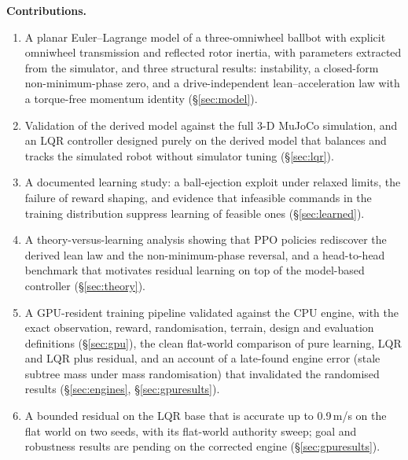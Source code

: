 \documentclass[conference]{IEEEtran}
\theoremstyle{remark}
\begin{document}
\textbf{Contributions.}
\begin{enumerate}
\item A planar Euler--Lagrange model of a three-omniwheel ballbot with explicit omniwheel transmission and reflected rotor inertia, with parameters extracted from the simulator, and three structural results: instability, a closed-form non-minimum-phase zero, and a drive-independent lean--acceleration law with a torque-free momentum identity (\S\ref{sec:model}).
\item Validation of the derived model against the full 3-D MuJoCo simulation, and an LQR controller designed purely on the derived model that balances and tracks the simulated robot without simulator tuning (\S\ref{sec:lqr}).
\item A documented learning study: a ball-ejection exploit under relaxed limits, the failure of reward shaping, and evidence that infeasible commands in the training distribution suppress learning of feasible ones (\S\ref{sec:learned}).
\item A theory-versus-learning analysis showing that PPO policies rediscover the derived lean law and the non-minimum-phase reversal, and a head-to-head benchmark that motivates residual learning on top of the model-based controller (\S\ref{sec:theory}).
\item A GPU-resident training pipeline validated against the CPU engine, with the exact observation, reward, randomisation, terrain, design and evaluation definitions (\S\ref{sec:gpu}), the clean flat-world comparison of pure learning, LQR and LQR plus residual, and an account of a late-found engine error (stale subtree mass under mass randomisation) that invalidated the randomised results (\S\ref{sec:engines}, \S\ref{sec:gpuresults}).
\item A bounded residual on the LQR base that is accurate up to 0.9\,m/s on the flat world on two seeds, with its flat-world authority sweep; goal and robustness results are pending on the corrected engine (\S\ref{sec:gpuresults}).
\end{enumerate}

\end{document}
